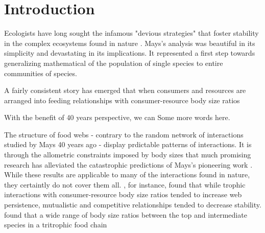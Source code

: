 \documentclass[../dissertation.tex]{\subfiles}
\begin{document}
\chapter{Introduction}
Ecologists have long sought the infamous "devious strategies" that foster
stability in the complex ecosystems found in nature \cite{Mays1972}. Mays's
analysis was beautiful in its simplicity and devastating in its implications.
It represented a first step towards generalizing mathematical of the population
of single species to entire communities of species.

A fairly consistent story
has emerged that when consumers and resources are arranged into feeding
relationships with consumer-resource body size ratios

With the benefit of 40 years perspective, we can 
Some more words here.

The structure of food webs - contrary to the random network of interactions
studied by Mays 40 years ago - display prdictable patterns of interactions. It
is through the allometric constraints imposed by body sizes that much promising
research has alleviated the catastrophic predictions of Mays's pioneering work
\cite{Brose2006,Otto2007,Berlow2009,Allesina2012}. While these results are
applicable to many of the interactions found in nature, they certaintly do not
cover them all. \cite{Allesina2012}, for instance, found that while
trophic interactions with consumer-resource body size ratios tended to increase
web persistence, mutualistic and
competitive relationships tended to decrease stability. \cite{Otto2007} found
that a wide range of body size ratios between the top and intermediate species
in a tritrophic food chain 
\end{document}
